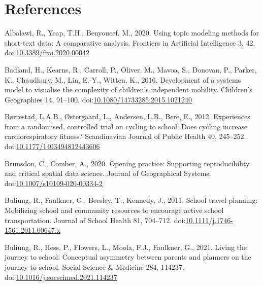 \documentclass[]{elsarticle} %
\newlength{\cslhangindent}
\newlength{\cslentryspacingunit} %
\newenvironment{CSLReferences}[2] %
 {%
  \setlength{\parindent}{0pt}
  \ifodd #1
  \let\oldpar\par
  \def\par{\hangindent=\cslhangindent\oldpar}
  \fi
  \setlength{\parskip}{#2\cslentryspacingunit}
 }%
 {}
\begin{document}
\hypertarget{references}{%
\section*{References}\label{references}}

\hypertarget{refs}{}
\begin{CSLReferences}{1}{0}
\leavevmode{}%
Albalawi, R., Yeap, T.H., Benyoucef, M., 2020. Using topic modeling
methods for short-text data: A comparative analysis. Frontiers in
Artificial Intelligence 3, 42.
doi:\href{https://doi.org/10.3389/frai.2020.00042}{10.3389/frai.2020.00042}

\leavevmode{}%
Badland, H., Kearns, R., Carroll, P., Oliver, M., Mavoa, S., Donovan,
P., Parker, K., Chaudhury, M., Lin, E.-Y., Witten, K., 2016. Development
of a systems model to visualise the complexity of children's independent
mobility. Children's Geographies 14, 91--100.
doi:\href{https://doi.org/10.1080/14733285.2015.1021240}{10.1080/14733285.2015.1021240}

\leavevmode{}%
Børrestad, L.A.B., Østergaard, L., Andersen, L.B., Bere, E., 2012.
Experiences from a randomised, controlled trial on cycling to school:
Does cycling increase cardiorespiratory fitness? Scandinavian Journal of
Public Health 40, 245--252.
doi:\href{https://doi.org/10.1177/1403494812443606}{10.1177/1403494812443606}

\leavevmode{}%
Brunsdon, C., Comber, A., 2020. Opening practice: Supporting
reproducibility and critical spatial data science. Journal of
Geographical Systems.
doi:\href{https://doi.org/10.1007/s10109-020-00334-2}{10.1007/s10109-020-00334-2}

\leavevmode{}%
Buliung, R., Faulkner, G., Beesley, T., Kennedy, J., 2011. School travel
planning: Mobilizing school and community resources to encourage active
school transportation. Journal of School Health 81, 704--712.
doi:\href{https://doi.org/10.1111/j.1746-1561.2011.00647.x}{10.1111/j.1746-1561.2011.00647.x}

\leavevmode{}%
Buliung, R., Hess, P., Flowers, L., Moola, F.J., Faulkner, G., 2021.
Living the journey to school: Conceptual asymmetry between parents and
planners on the journey to school. Social Science \& Medicine 284,
114237.
doi:\href{https://doi.org/10.1016/j.socscimed.2021.114237}{10.1016/j.socscimed.2021.114237}


\end{CSLReferences}
\end{document}
